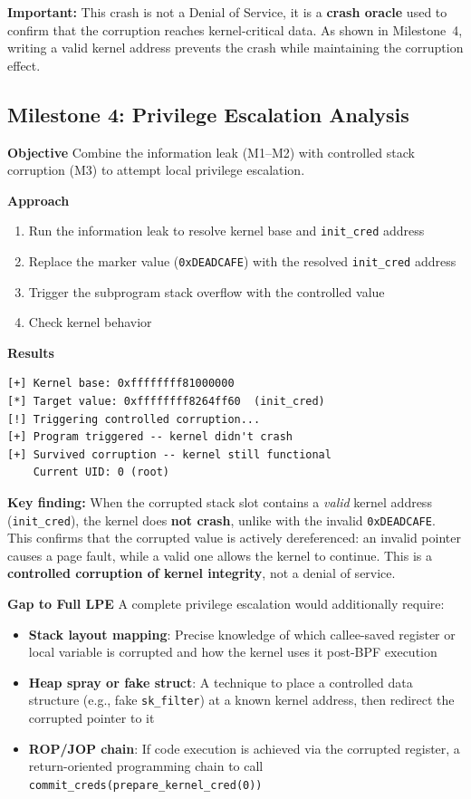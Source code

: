 \textbf{Important:} This crash is not a Denial of Service, it is a \textbf{crash oracle} used to confirm that the corruption reaches kernel-critical data. As shown in Milestone~4, writing a valid kernel address prevents the crash while maintaining the corruption effect.


\subsection{Milestone 4: Privilege Escalation Analysis}

\textbf{Objective}
Combine the information leak (M1--M2) with controlled stack corruption (M3) to attempt local privilege escalation.

\textbf{Approach}
\begin{enumerate}
    \item Run the information leak to resolve kernel base and \texttt{init\_cred} address
    \item Replace the marker value (\texttt{0xDEADCAFE}) with the resolved \texttt{init\_cred} address
    \item Trigger the subprogram stack overflow with the controlled value
    \item Check kernel behavior
\end{enumerate}

\textbf{Results}
\begin{lstlisting}[style=log,caption={Milestone 4 output}]
[+] Kernel base: 0xffffffff81000000
[*] Target value: 0xffffffff8264ff60  (init_cred)
[!] Triggering controlled corruption...
[+] Program triggered -- kernel didn't crash
[+] Survived corruption -- kernel still functional
    Current UID: 0 (root)
\end{lstlisting}

\textbf{Key finding:} When the corrupted stack slot contains a \emph{valid} kernel address (\texttt{init\_cred}), the kernel does \textbf{not crash}, unlike with the invalid \texttt{0xDEADCAFE}. This confirms that the corrupted value is actively dereferenced: an invalid pointer causes a page fault, while a valid one allows the kernel to continue. This is a \textbf{controlled corruption of kernel integrity}, not a denial of service.

\textbf{Gap to Full LPE}
A complete privilege escalation would additionally require:
\begin{itemize}
    \item \textbf{Stack layout mapping}: Precise knowledge of which callee-saved register or local variable is corrupted and how the kernel uses it post-BPF execution
    \item \textbf{Heap spray or fake struct}: A technique to place a controlled data structure (e.g., fake \texttt{sk\_filter}) at a known kernel address, then redirect the corrupted pointer to it
    \item \textbf{ROP/JOP chain}: If code execution is achieved via the corrupted register, a return-oriented programming chain to call \texttt{commit\_creds(prepare\_kernel\_cred(0))}
\end{itemize}


